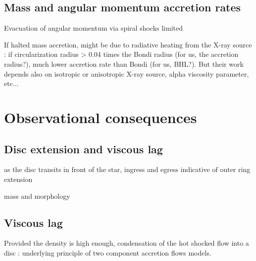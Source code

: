 \documentclass{aa}
\begin{document}
\subsection{Mass and angular momentum accretion rates}
\label{sec:mdot_ldot}

Evacuation of angular momentum via spiral shocks limited

If halted mass accretion, might be due to radiative heating from the X-ray source \citep{Sugimura2018} : if circularization radius > 0.04 times the Bondi radius (for us, the accretion radius?), much lower accretion rate than Bondi (for us, BHL?). But their work depends also on isotropic or anisotropic X-ray source, alpha viscosity parameter, etc...

\section{Observational consequences}
\label{sec:obs_cons}

\subsection{Disc extension and viscous lag}
\label{sec:rout}

as the disc transits in front of the star, ingress and egress indicative of outer ring extension

mass and morphology

\subsection{Viscous lag}
\label{sec:visc}

Provided the density is high enough, condensation of the hot shocked flow into a disc \citep[][and references therein]{Taam2018} : underlying principle of two component accretion flows models.
\end{document}
